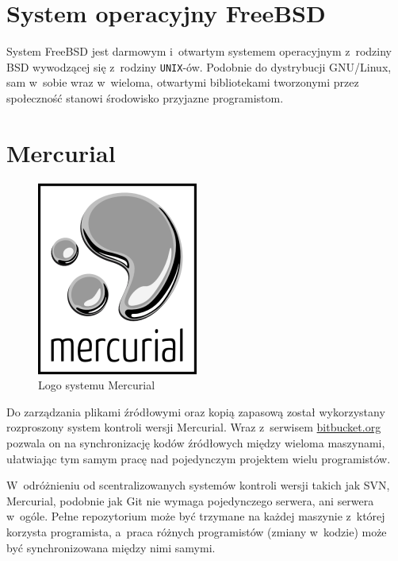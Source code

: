 \section{System operacyjny FreeBSD}
\par
System FreeBSD jest darmowym i~otwartym systemem operacyjnym z~rodziny BSD wywodzącej się z~rodziny \texttt{UNIX}-ów. Podobnie do dystrybucji GNU/Linux, sam w~sobie wraz w~wieloma, otwartymi bibliotekami tworzonymi przez społeczność stanowi środowisko przyjazne programistom.

\section{Mercurial}
\begin{figure}
\begin{center}
\includegraphics[scale=0.50]{img/mercurial_logo.png}
\end{center}
\caption{Logo systemu Mercurial}
\end{figure}
\par
Do zarządzania plikami źródłowymi oraz kopią zapasową został wykorzystany rozproszony system kontroli wersji Mercurial. Wraz z~serwisem \url{bitbucket.org} pozwala on na synchronizację kodów źródłowych między wieloma maszynami, ułatwiając tym samym pracę nad pojedynczym projektem wielu programistów.
\par
 W~odróżnieniu od scentralizowanych systemów kontroli wersji takich jak SVN, Mercurial, podobnie jak Git nie wymaga pojedynczego serwera, ani serwera w~ogóle. Pełne repozytorium może być trzymane na każdej maszynie z~której korzysta programista, a~praca różnych programistów (zmiany w~kodzie) może być synchronizowana między nimi samymi.

